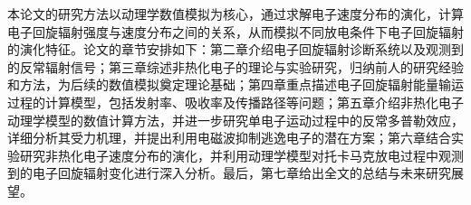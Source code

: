 本论文的研究方法以动理学数值模拟为核心，通过求解电子速度分布的演化，计算电子回旋辐射强度与速度分布之间的关系，从而模拟不同放电条件下电子回旋辐射的演化特征。论文的章节安排如下：第二章介绍电子回旋辐射诊断系统以及观测到的反常辐射信号；第三章综述非热化电子的理论与实验研究，归纳前人的研究经验和方法，为后续的数值模拟奠定理论基础；第四章重点描述电子回旋辐射能量输运过程的计算模型，包括发射率、吸收率及传播路径等问题；第五章介绍非热化电子动理学模型的数值计算方法，并进一步研究单电子运动过程中的反常多普勒效应，详细分析其受力机理，并提出利用电磁波抑制逃逸电子的潜在方案；第六章结合实验研究非热化电子速度分布的演化，并利用动理学模型对托卡马克放电过程中观测到的电子回旋辐射变化进行深入分析。最后，第七章给出全文的总结与未来研究展望。
%
